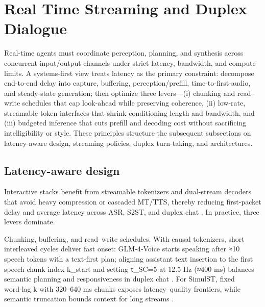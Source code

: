 \documentclass{article}
\begin{document}
\section{Real Time Streaming and Duplex Dialogue} \label{sec:Real Time Streaming and Duplex Dialogue}

\noindent Real-time agents must coordinate perception, planning, and synthesis across concurrent input/output channels under strict latency, bandwidth, and compute limits. A systems-first view treats latency as the primary constraint: decompose end-to-end delay into capture, buffering, perception/prefill, time-to-first-audio, and steady-state generation; then optimize three levers—(i) chunking and read–write schedules that cap look-ahead while preserving coherence, (ii) low-rate, streamable token interfaces that shrink conditioning length and bandwidth, and (iii) budgeted inference that cuts prefill and decoding cost without sacrificing intelligibility or style. These principles structure the subsequent subsections on latency-aware design, streaming policies, duplex turn-taking, and architectures.



\subsection{Latency-aware design} \label{subsec:Latency-aware design}

Interactive stacks benefit from streamable tokenizers and dual-stream decoders that avoid heavy compression or cascaded MT/TTS, thereby reducing first-packet delay and average latency across ASR, S2ST, and duplex chat \cite{li2025continuousspeechtokenizertext,har-tuv2025pastphoneticacousticspeechtokenizer,bai2025dmelspeechtokenizationmadesimple,zhao2024textlessstreamingspeechtranslationsemant,sheng2025syncspeechlowlatencyefficientdualstreamt}. In practice, three levers dominate.

Chunking, buffering, and read–write schedules. With causal tokenizers, short interleaved cycles deliver fast onset: GLM‑4‑Voice starts speaking after ≈10 speech tokens with a text‑first plan; aligning assistant text insertion to the first speech chunk index k_start and setting τ_SC=5 at 12.5 Hz (≈400 ms) balances semantic planning and responsiveness in duplex chat \cite{zeng2024glm4voicetowardsintelligenthumanlikeends,cui2025thinkbeforeyoutalkenhancingmeaningfuldia}. For SimulST, fixed word‑lag k with 320–640 ms chunks exposes latency–quality frontiers, while semantic truncation bounds context for long streams \cite{guo2025streamuniachievingstreamingspeechtransla}.
\end{document}
